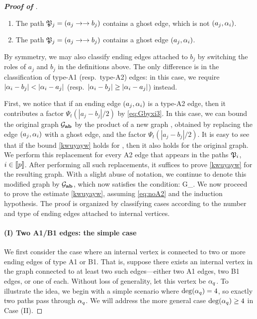 \begin{proof}[\bf Proof of ]
\begin{enumerate}
     \item[{\bf B1}:] The path $\mathfrak{P}_j=( a_j \to \to b_j )$ contains a ghost edge, which is not $( a_j , \alpha_i )$. 
     
      \item[{\bf B2}:] The path $\mathfrak{P}_j=( a_j \to \to b_j )$ contains a ghost edge $( a_j , \alpha_i )$.
      
\end{enumerate}
By symmetry, we may also classify ending edges attached to $b_j$ by switching the roles of $a_j$ and $b_j$ in the definitions above. The only difference is in the classification of type-A1 (resp.~type-A2) edges: in this case, we require $|\alpha_i-b_j|< |\alpha_i-a_j|$ (resp.~$|\alpha_i-b_j|\ge |\alpha_i-a_j|$) instead.  


First, we notice that if an ending edge $\left({a_j,\alpha_i}\right)$ is a type-A2 edge, then it contributes a factor $\Psi_t(|a_j-b_j|/2)$ by \eqref{eq:Gbyxi3}. In this case, we can bound the original graph $\mathcal G_{{\mathbf{a}}{\mathbf{b}}}$ by the product of a new graph , obtained by replacing the edge $\left({a_j,\alpha_i}\right)$ with a ghost edge, and the factor $\Psi_t(|a_j-b_j|/2)$. It is easy to see that if the bound \eqref{kwuyayw} holds for , then it also holds for the original graph. 
We perform this replacement for every A2 edge that appears in the paths $\mathfrak{P}_i$, $i\in\llbracket{p}\rrbracket$.  %
After performing all such replacements, it suffices to prove \eqref{kwuyayw} for the resulting graph.
With a slight abuse of notation, we continue to denote this modified graph by $\mathcal G_{{\mathbf{a}}{\mathbf{b}}}$, which now satisfies the condition: 
\be\label{eq:noA2}
\cal G_{\ba\bfb}.
\ee
We now proceed to prove the estimate \eqref{kwuyayw}, assuming \eqref{eq:noA2} and the induction hypothesis. The proof is organized by classifying cases according to the number and type of ending edges attached to internal vertices.

\medskip
\paragraph{\bf (I) Two A1/B1 edges: the simple case}

We first consider the case where an internal vertex is connected to two or more ending edges of type A1 or B1. That is, suppose there exists an internal vertex in the graph connected to at least two such edges---either two A1 edges, two B1 edges, or one of each. Without loss of generality, let this vertex be $\alpha_q$. To illustrate the idea, we begin with a simple scenario where $\deg(\alpha_q)=4$, so exactly two paths pass through $\alpha_q$. We will address the more general case $\deg(\alpha_q)\ge 4$ in Case (II). 


\end{proof}
